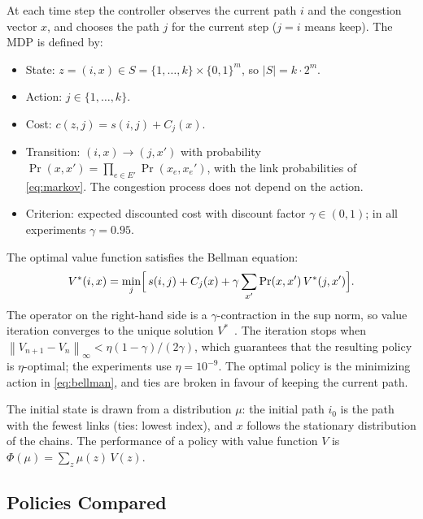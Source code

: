 \documentclass{amsart}
\newcommand{\abs}[1]{\left\lvert #1 \right\rvert}
\newcommand{\norm}[1]{\left\lVert #1 \right\rVert}
\begin{document}
At each time step the controller observes the current path $i$ and the congestion vector $x$, and chooses the path $j$ for the current step ($j = i$ means keep). The MDP is defined by:
\begin{itemize}
  \item State: $z = (i, x) \in S = \{1, \dots, k\} \times \{0,1\}^m$, so $\abs{S} = k \cdot 2^m$.
  \item Action: $j \in \{1, \dots, k\}$.
  \item Cost: $c(z, j) = s(i,j) + C_j(x)$.
  \item Transition: $(i,x) \to (j,x')$ with probability $\Pr(x,x') = \prod_{e \in E'} \Pr(x_e,x_e')$, with the link probabilities of \eqref{eq:markov}. The congestion process does not depend on the action.
  \item Criterion: expected discounted cost with discount factor $\gamma \in (0,1)$; in all experiments $\gamma = 0.95$.
\end{itemize}
The optimal value function satisfies the Bellman equation:
\begin{equation}
  V^*(i,x) = \min_{j} \Bigl[\, s(i,j) + C_j(x) + \gamma \sum_{x'} \Pr(x,x')\, V^*(j,x') \Bigr].
  \label{eq:bellman}
\end{equation}
The operator on the right-hand side is a $\gamma$-contraction in the sup norm, so value iteration converges to the unique solution $V^*$~\cite{puterman1994,bertsekas}. The iteration stops when $\norm{V_{n+1} - V_n}_\infty < \eta (1-\gamma)/(2\gamma)$, which guarantees that the resulting policy is $\eta$-optimal; the experiments use $\eta = 10^{-9}$. The optimal policy is the minimizing action in \eqref{eq:bellman}, and ties are broken in favour of keeping the current path.

The initial state is drawn from a distribution $\mu$: the initial path $i_0$ is the path with the fewest links (ties: lowest index), and $x$ follows the stationary distribution of the chains. The performance of a policy with value function $V$ is $\Phi(\mu) = \sum_{z} \mu(z)\, V(z)$.

\subsection{Policies Compared}
\end{document}
